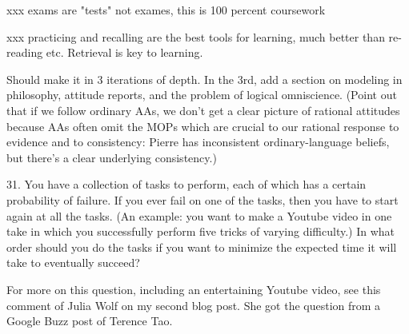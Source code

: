 \documentclass{../wobook2017}
\begin{document}
{xxx exams are "tests" not exames, this is 100 percent coursework

xxx practicing and recalling are the best tools for learning, much
better than re-reading etc. Retrieval is key to learning.



  Should make it in 3 iterations of depth. In the 3rd, add a section
  on modeling in philosophy, attitude reports, and the problem of
  logical omniscience. (Point out that if we follow ordinary AAs, we
  don't get a clear picture of rational attitudes because AAs often
  omit the MOPs which are crucial to our rational response to evidence
  and to consistency: Pierre has inconsistent ordinary-language
  beliefs, but there's a clear underlying consistency.)
  
31. You have a collection of tasks to perform, each of which has a certain probability of failure. If you ever fail on one of the tasks, then you have to start again at all the tasks. (An example: you want to make a Youtube video in one take in which you successfully perform five tricks of varying difficulty.) In what order should you do the tasks if you want to minimize the expected time it will take to eventually succeed?

For more on this question, including an entertaining Youtube video, see this comment of Julia Wolf on my second blog post. She got the question from a Google Buzz post of Terence Tao.


} %












\end{document}
